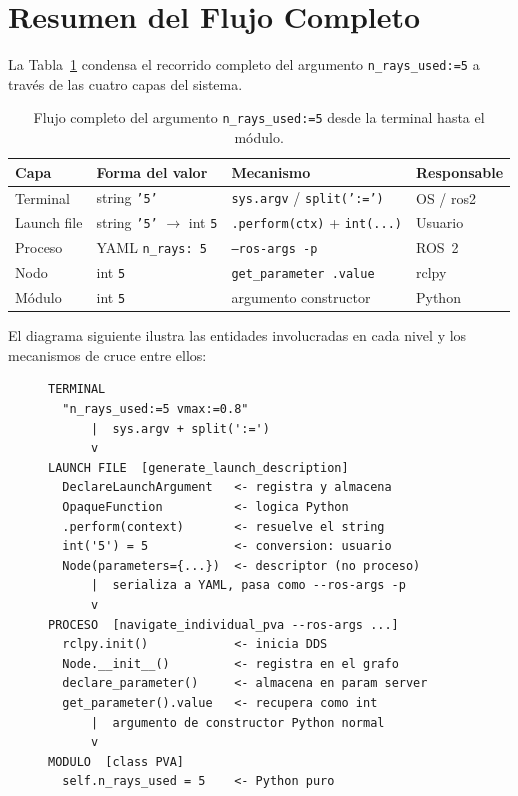 \section{Resumen del Flujo Completo}

La Tabla~\ref{tab:resumen_flujo} condensa el recorrido completo del argumento \texttt{n\_rays\_used:=5} a través de las cuatro capas del sistema.

\begin{table}[H]
  \centering
  \caption{Flujo completo del argumento \texttt{n\_rays\_used:=5} desde la terminal hasta el módulo.}
  \label{tab:resumen_flujo}
  \begin{tabular}{p{1.6cm}p{1.8cm}p{2.2cm}p{1.8cm}}
    \toprule
    Capa & Forma del valor & Mecanismo & Responsable \\
    \midrule
    Terminal &
      string \texttt{'5'} &
      \texttt{sys.argv} / \texttt{split(':=')} &
      OS / ros2 \\[4pt]
    Launch file &
      string \texttt{'5'} $\to$ int \texttt{5} &
      \texttt{.perform(ctx)} + \texttt{int(...)} &
      Usuario \\[4pt]
    Proceso &
      YAML \texttt{n\_rays: 5} &
      \texttt{--ros-args -p} &
      ROS~2 \\[4pt]
    Nodo &
      int \texttt{5} &
      \texttt{get\_parameter .value} &
      rclpy \\[4pt]
    Módulo &
      int \texttt{5} &
      argumento constructor &
      Python \\
    \bottomrule
  \end{tabular}
\end{table}

El diagrama siguiente ilustra las entidades involucradas en cada nivel y los mecanismos de cruce entre ellos:

\begin{figure}[H]
\centering
\begin{lstlisting}[style=bash, caption={Diagrama de flujo Terminal $\to$ Módulo.}, label={lst:diagrama}]
TERMINAL
  "n_rays_used:=5 vmax:=0.8"
      |  sys.argv + split(':=')
      v
LAUNCH FILE  [generate_launch_description]
  DeclareLaunchArgument   <- registra y almacena
  OpaqueFunction          <- logica Python
  .perform(context)       <- resuelve el string
  int('5') = 5            <- conversion: usuario
  Node(parameters={...})  <- descriptor (no proceso)
      |  serializa a YAML, pasa como --ros-args -p
      v
PROCESO  [navigate_individual_pva --ros-args ...]
  rclpy.init()            <- inicia DDS
  Node.__init__()         <- registra en el grafo
  declare_parameter()     <- almacena en param server
  get_parameter().value   <- recupera como int
      |  argumento de constructor Python normal
      v
MODULO  [class PVA]
  self.n_rays_used = 5    <- Python puro
\end{lstlisting}
\end{figure}

